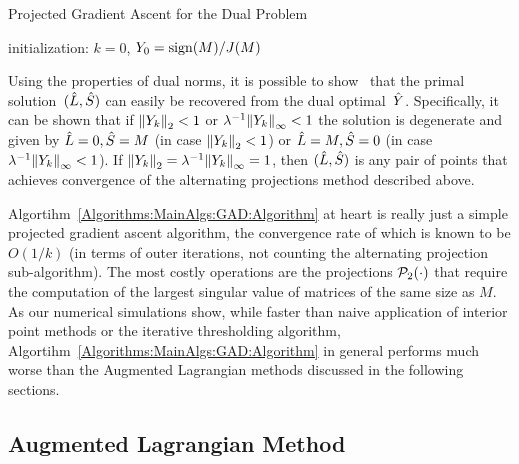 %
\begin{algorithm}
\caption{Projected Gradient Ascent for the Dual Problem}
initialization: $k=0$, $Y_0 = \operatorname{sign}(M)/J(M)$\;
\label{Algorithms:MainAlgs:GAD:Algorithm}
\end{algorithm}

Using the properties of dual norms, it is possible to show~\cite{Lin:2009kx} that the primal solution~$({\hat{L}},{\hat{S}})$ can easily be recovered from the dual optimal~${\hat{Y}}$. Specifically, it can be shown that if ${\left\|Y_k\right\|}_{2}^{} <1$ or $\lambda^{-1}{\left\|Y_k\right\|}_{\infty}^{}<1$ the solution is degenerate and given by ${\hat{L}} = 0,{\hat{S}} =M$ (in case ${\left\|Y_k\right\|}_{2}^{} <1$) or ${\hat{L}} = M,{\hat{S}} =0$ (in case $\lambda^{-1} {\left\|Y_k\right\|}_{\infty}^{} <1$). If ${\left\|Y_k\right\|}_{2}^{} = \lambda^{-1} {\left\|Y_k\right\|}_{\infty}^{} =1$, then $({\hat{L}},{\hat{S}})$ is any pair of points that achieves convergence of the alternating projections method described above. 

Algortihm~\eqref{Algorithms:MainAlgs:GAD:Algorithm} at heart is really just a simple projected gradient ascent algorithm, the convergence rate of which is known to be $O(1/k)$ (in terms of outer iterations, not counting the alternating projection sub-algorithm). The most costly operations are the projections ${\mathcal{P}}_{2}(\cdot)$ that require the computation of the largest singular value of matrices of the same size as $M$. As our numerical simulations show, while faster than naive application of interior point methods or the iterative thresholding algorithm, Algortihm~\eqref{Algorithms:MainAlgs:GAD:Algorithm} in general performs much worse than the Augmented Lagrangian methods discussed in the following sections. 


\subsection{Augmented Lagrangian Method}
\label{Algorithms:MainAlgs:AugLag:Subsec}


